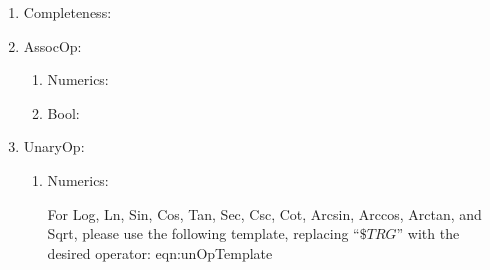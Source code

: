 \begin{enumerate}

    \item Completeness:
        \newrule{}
            {}
        
        \newrule{}
            {}

    \item AssocOp:
        \begin{enumerate}
            \item Numerics:
                    {}
        
                    {}
    
            \item Bool:
                \newrule{}
                    {}
        
                \newrule{}
                    {}
        \end{enumerate}

    \item UnaryOp:
        \begin{enumerate}
            \item Numerics:
                    {}

                    {}
                
                    {}
                
                For Log, Ln, Sin, Cos, Tan, Sec, Csc, Cot, Arcsin, Arccos, Arctan, and Sqrt, please use the following template, replacing ``$\$TRG$'' with the desired operator:
                \newlblrule{}
                    {}{eqn:unOpTemplate}

                \newrule{}
                    {}
                
                \newrule{}
                    {}
            
                \newrule{}
                    {}

                \newrule{}
                    {}
                

\end{enumerate}
\end{enumerate}
